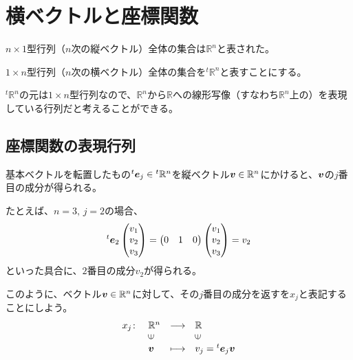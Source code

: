 \documentclass[../../../topic_linear-algebra]{subfiles}
\begin{document}
\sectionline
\section{横ベクトルと座標関数}

$n \times 1$型行列（$n$次の縦ベクトル）全体の集合は$\mathbb{R}^n$と表された。

$1 \times n$型行列（$n$次の横ベクトル）全体の集合を${}^t\mathbb{R}^n$と表すことにする。

\br

${}^t\mathbb{R}^n$の元は$1 \times n$型行列なので、$\mathbb{R}^n$から$\mathbb{R}$への線形写像（すなわち$\mathbb{R}^n$上の）を表現している行列だと考えることができる。

\subsection{座標関数の表現行列}

基本ベクトルを転置したもの${}^t\vb*{e}_j \in {}^t\mathbb{R}^n$を縦ベクトル$\vb*{v} \in \mathbb{R}^n$にかけると、$\vb*{v}$の$j$番目の成分が得られる。

たとえば、$n=3,\,j=2$の場合、
\begin{equation*}
  {}^t\vb*{e}_2\begin{pmatrix}
    v_1 \\
    v_2 \\
    v_3
  \end{pmatrix} = \begin{pmatrix}
    0 & 1 & 0
  \end{pmatrix}
  \begin{pmatrix}
    v_1 \\
    v_2 \\
    v_3
  \end{pmatrix}
  = v_2
\end{equation*}
といった具合に、$2$番目の成分$v_2$が得られる。

\br

このように、ベクトル$\vb*{v} \in \mathbb{R}^n$に対して、その$j$番目の成分を返すを$x_j$と表記することにしよう。
\begin{equation*}
  \begin{array}{llll}
    x_j\colon & \mathbb{R}^n         & \longrightarrow & \mathbb{R}          \\
            & \rotatebox{90}{$\in$} &                 & \rotatebox{90}{$\in$} \\
            & \vb*{v}               & \longmapsto     & v_j = {}^t\vb*{e}_j \vb*{v}
  \end{array}
\end{equation*}
\end{document}
